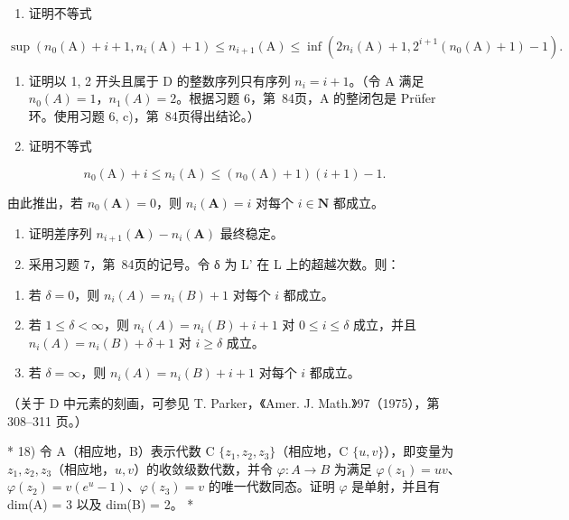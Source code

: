 \begin{enumerate}
\def\labelenumi{\alph{enumi})}
\tightlist
\item
  证明不等式
\end{enumerate}

\[
\sup \left(n _ {0} (\mathrm{A}) + i + 1, n _ {i} (\mathrm{A}) + 1\right) \leqslant n _ {i + 1} (\mathrm{A}) \leqslant \inf \left(2 n _ {i} (\mathrm{A}) + 1, 2 ^ {i + 1} \left(n _ {0} (\mathrm{A}) + 1\right) - 1\right).
\]

\begin{enumerate}
\def\labelenumi{\alph{enumi})}
\setcounter{enumi}{1}
\tightlist
\item
  证明以 1, 2 开头且属于 D 的整数序列只有序列 \(n_{i}=i+1\)。（令 A 满足 \(n_{0}(A)=1\)，\(n_{1}(A)=2\)。根据习题 6，第~84页，A 的整闭包是 Prüfer 环。使用习题 6, c)，第~84页得出结论。）\\
\item
  证明不等式
\end{enumerate}

\[
n _ {0} (\mathrm{A}) + i \leqslant n _ {i} (\mathrm{A}) \leqslant (n _ {0} (\mathrm{A}) + 1) (i + 1) - 1.
\]

  由此推出，若 \(n_0(\mathbf{A}) = 0\)，则 \(n_i(\mathbf{A}) = i\) 对每个 \(i \in \mathbf{N}\) 都成立。

\begin{enumerate}
\def\labelenumi{\alph{enumi})}
\setcounter{enumi}{3}
\item
  证明差序列 \(n_{i+1}(\mathbf{A}) - n_i(\mathbf{A})\) 最终稳定。
\item
  采用习题 7，第~84页的记号。令 δ 为 L' 在 L 上的超越次数。则：
\end{enumerate}

\begin{enumerate}
\def\labelenumi{(\roman{enumi})}
\item
  若 \(\delta = 0\)，则 \(n_i(A) = n_i(B) + 1\) 对每个 \(i\) 都成立。
\item
  若 \(1 \leqslant \delta < \infty\)，则 \(n_i(A) = n_i(B) + i + 1\) 对 \(0 \leqslant i \leqslant \delta\) 成立，并且 \(n_i(A) = n_i(B) + \delta + 1\) 对 \(i \geqslant \delta\) 成立。
\item
  若 \(\delta = \infty\)，则 \(n_i(A) = n_i(B) + i + 1\) 对每个 \(i\) 都成立。
\end{enumerate}

（关于 D 中元素的刻画，可参见 T. Parker，《Amer. J. Math.》97（1975），第 308–311 页。）

* 18) 令 A（相应地，B）表示代数 C \(\{z_{1}, z_{2}, z_{3}\}\)（相应地，C \(\{u, v\}\)），即变量为 \(z_{1}, z_{2}, z_{3}\)（相应地，\(u, v\)）的收敛级数代数，并令 \(\varphi: A \to B\) 为满足 \(\varphi(z_{1}) = uv\)、\(\varphi(z_{2}) = v(e^{u} - 1)\)、\(\varphi(z_{3}) = v\) 的唯一代数同态。证明 \(\varphi\) 是单射，并且有 dim(A) = 3 以及 dim(B) = 2。 *

